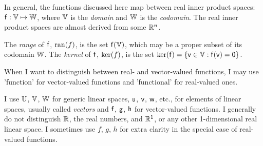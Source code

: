 \setcounter{currentlevel}{\value{baseSectionLevel}}
\label{sec:affine-spaces}
\setcounter{currentlevel}{\value{baseSectionLevel}}
\label{sec:Functions-between-spaces}

In general, the functions discussed here map between real inner product spaces:
$\mathsf{f}:\mathbb{V} \mapsto \mathbb{W}$, where $\mathbb{V}$ is the
\textit{domain} and $\mathbb{W}$ is the \textit{codomain}.
The real inner product spaces are almost derived from some $\mathbb{R}^n$.

The \textit{range} of $\mathsf{f}$, $\mathrm{ran}(f)$, is the set $\mathsf{f}(\mathbb{V})$,
which may be a proper subset of its codomain $\mathbb{W}$.
The \textit{kernel} of $\mathsf{f}$, $\mathrm{ker}(f)$, is the set
$\mathrm{ker}(\mathsf{f}) = \{ \mathsf{v} \in \mathbb{V} : \mathsf{f}(\mathsf{v}) = {\mathsf 0} \}$.

When I want to distinguish between real- and vector-valued functions,
I may use 'function' for vector-valued functions and
'functional' for real-valued ones.

I use $\mathbb{U}$, $\mathbb{V}$, $\mathbb{W}$ for generic linear spaces,
$\mathsf{u}$, $\mathsf{v}$, $\mathsf{w}$, etc., for elements of linear spaces,
usually called \textit{vectors}
and
$\mathsf{f}$, $\mathsf{g}$, $\mathsf{h}$ for vector-valued functions.
I generally do not distinguish $\mathbb{R}$, the real numbers,
and $\mathbb{R}^1$, or any other 1-dimensional real linear space.
I sometimes use $f$, $g$, $h$ for extra clarity in the special
case of real-valued functions.

